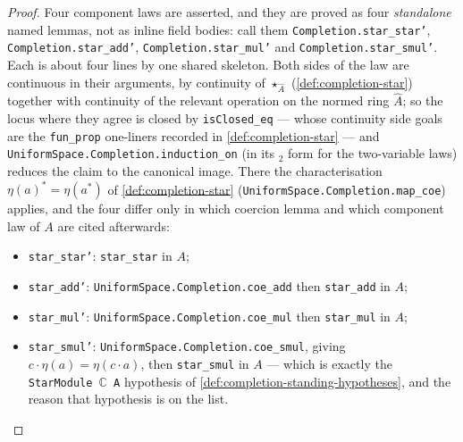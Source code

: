 \begin{proof}
    \leanok
    Four component laws are asserted, and they are proved as four \emph{standalone} named lemmas, not as inline field bodies: call them \texttt{Completion.star\_star'}, \texttt{Completion.star\_add'}, \texttt{Completion.star\_mul'} and \texttt{Completion.star\_smul'}. Each is about four lines by one shared skeleton. Both sides of the law are continuous in their arguments, by continuity of $\star_{\widehat{A}}$ (\ref{def:completion-star}) together with continuity of the relevant operation on the normed ring $\widehat{A}$; so the locus where they agree is closed by \texttt{isClosed\_eq} --- whose continuity side goals are the \texttt{fun\_prop} one-liners recorded in \ref{def:completion-star} --- and \texttt{UniformSpace.Completion.induction\_on} (in its \ensuremath{{}_2} form for the two-variable laws) reduces the claim to the canonical image. There the characterisation $\eta(a)^{*} = \eta(a^{*})$ of \ref{def:completion-star} (\texttt{UniformSpace.Completion.map\_coe}) applies, and the four differ only in which coercion lemma and which component law of $A$ are cited afterwards:
    \begin{itemize}
        \item \texttt{star\_star'}: \texttt{star\_star} in $A$;
        \item \texttt{star\_add'}: \texttt{UniformSpace.Completion.coe\_add} then \texttt{star\_add} in $A$;
        \item \texttt{star\_mul'}: \texttt{UniformSpace.Completion.coe\_mul} then \texttt{star\_mul} in $A$;
        \item \texttt{star\_smul'}: \texttt{UniformSpace.Completion.coe\_smul}, giving $c \cdot \eta(a) = \eta(c \cdot a)$, then \texttt{star\_smul} in $A$ --- which is exactly the \texttt{StarModule \ensuremath{\mathbb{C}} A} hypothesis of \ref{def:completion-standing-hypotheses}, and the reason that hypothesis is on the list.
    \end{itemize}

\end{proof}

